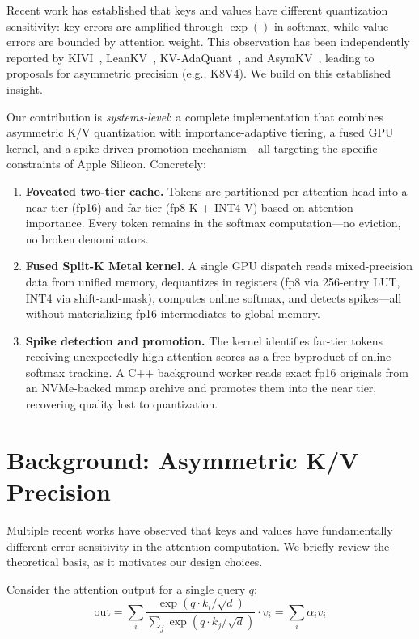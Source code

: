 \documentclass{article}
\begin{document}
Recent work has established that keys and values have different
quantization sensitivity: key errors are amplified through $\exp()$ in
softmax, while value errors are bounded by attention weight. This
observation has been independently reported by
KIVI~\cite{kivi}, LeanKV~\cite{leankv}, KV-AdaQuant~\cite{kvadaquant},
and AsymKV~\cite{asymkv}, leading to proposals for asymmetric precision
(e.g., K8V4). We build on this established insight.

Our contribution is \emph{systems-level}: a complete implementation that
combines asymmetric K/V quantization with importance-adaptive tiering,
a fused GPU kernel, and a spike-driven promotion mechanism---all
targeting the specific constraints of Apple Silicon. Concretely:

\begin{enumerate}
\item \textbf{Foveated two-tier cache.} Tokens are partitioned per
  attention head into a near tier (fp16) and far tier (fp8 K + INT4 V)
  based on attention importance. Every token remains in the softmax
  computation---no eviction, no broken denominators.
\item \textbf{Fused Split-K Metal kernel.} A single GPU dispatch reads
  mixed-precision data from unified memory, dequantizes in registers
  (fp8 via 256-entry LUT, INT4 via shift-and-mask), computes online
  softmax, and detects spikes---all without materializing fp16
  intermediates to global memory.
\item \textbf{Spike detection and promotion.} The kernel identifies
  far-tier tokens receiving unexpectedly high attention scores as a free
  byproduct of online softmax tracking. A C++ background worker reads
  exact fp16 originals from an NVMe-backed mmap archive and promotes
  them into the near tier, recovering quality lost to quantization.
\end{enumerate}

\section{Background: Asymmetric K/V Precision}
\label{sec:asymmetric}

Multiple recent works have observed that keys and values have
fundamentally different error sensitivity in the attention computation.
We briefly review the theoretical basis, as it motivates our design
choices.

Consider the attention output for a single query $q$:
\begin{equation}
  \text{out} = \sum_i \frac{\exp(q \cdot k_i / \sqrt{d})}{\sum_j \exp(q \cdot k_j / \sqrt{d})} \cdot v_i
  = \sum_i \alpha_i v_i
\end{equation}
\end{document}
